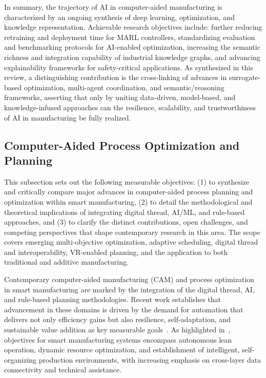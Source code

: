 \documentclass[sigconf]{acmart}
\begin{document}
In summary, the trajectory of AI in computer-aided manufacturing is characterized by an ongoing synthesis of deep learning, optimization, and knowledge representation. Achievable research objectives include: further reducing retraining and deployment time for MARL controllers, standardizing evaluation and benchmarking protocols for AI-enabled optimization, increasing the semantic richness and integration capability of industrial knowledge graphs, and advancing explainability frameworks for safety-critical applications. As synthesized in this review, a distinguishing contribution is the cross-linking of advances in surrogate-based optimization, multi-agent coordination, and semantic/reasoning frameworks, asserting that only by uniting data-driven, model-based, and knowledge-infused approaches can the resilience, scalability, and trustworthiness of AI in manufacturing be fully realized.

\subsection{Computer-Aided Process Optimization and Planning}

This subsection sets out the following measurable objectives: (1) to synthesize and critically compare major advances in computer-aided process planning and optimization within smart manufacturing, (2) to detail the methodological and theoretical implications of integrating digital thread, AI/ML, and rule-based approaches, and (3) to clarify the distinct contributions, open challenges, and competing perspectives that shape contemporary research in this area. The scope covers emerging multi-objective optimization, adaptive scheduling, digital thread and interoperability, VR-enabled planning, and the application to both traditional and additive manufacturing.

Contemporary computer-aided manufacturing (CAM) and process optimization in smart manufacturing are marked by the integration of the digital thread, AI, and rule-based planning methodologies. Recent work establishes that advancement in these domains is driven by the demand for automation that delivers not only efficiency gains but also resilience, self-adaptation, and sustainable value addition as key measurable goals~\cite{ref16,ref27,ref29,ref30}. As highlighted in~\cite{ref16}, objectives for smart manufacturing systems encompass autonomous lean operation, dynamic resource optimization, and establishment of intelligent, self-organizing production environments, with increasing emphasis on cross-layer data connectivity and technical assistance.
\end{document}
